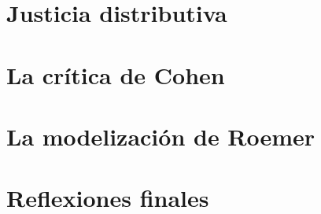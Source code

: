 \documentclass[11pt]{article}
\begin{document}
\section{Justicia distributiva} \label{sec2}
 



\section{La crítica de Cohen} \label{sec3}


\section{La modelización de Roemer} \label{sec4}


\section{Reflexiones finales} \label{sec5}



\cleardoublepage
{}
{}

\end{document}
